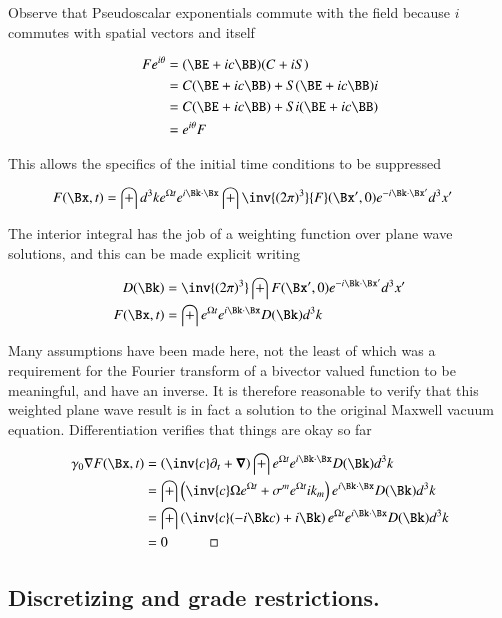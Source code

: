 Observe that Pseudoscalar exponentials commute with the field because $i$ commutes with spatial vectors and itself

\begin{align*}
F e^{i\theta}
&= (\BE + i c \BB) (C + iS) \\
&=
C (\BE + i c \BB)
+ S (\BE + i c \BB) i  \\
&=
C (\BE + i c \BB)
+ S i (\BE + i c \BB) \\
&=
e^{i\theta} F
\end{align*}

This allows the specifics of the initial time conditions to be suppressed

\begin{align}
F(\Bx,t) &= \int d^3 k e^{\Omega t} e^{i \Bk \cdot \Bx} \int \inv{(2\pi)^3} {F}(\Bx',0) e^{-i \Bk \cdot \Bx'}  d^3 x'
\end{align}

The interior integral has the job of a weighting function over plane wave solutions, and this can be made explicit writing

\begin{align}
D(\Bk) &= \inv{(2\pi)^3} \int {F}(\Bx',0) e^{-i \Bk \cdot \Bx'}  d^3 x' \\
F(\Bx,t) &= \int e^{\Omega t} e^{i \Bk \cdot \Bx} D(\Bk) d^3 k
\end{align}

Many assumptions have been made here, not the least of which was a requirement for the Fourier transform of a bivector valued function to be meaningful, and have an inverse.  It is therefore reasonable to verify that this weighted plane wave result is in fact a solution to the original Maxwell vacuum equation.  Differentiation verifies that things are okay so far

\begin{align*}
\gamma_0 \grad F(\Bx,t)
&=
\left(\inv{c}\partial_t + \spacegrad \right)\int e^{\Omega t} e^{i \Bk \cdot \Bx} D(\Bk) d^3 k \\
&=
\int \left(\inv{c}\Omega e^{\Omega t} + \sigma^m e^{\Omega t} i k_m \right) e^{i \Bk \cdot \Bx} D(\Bk) d^3 k \\
&=
\int \left(\inv{c}(-i \Bk c) + i \Bk \right) e^{\Omega t} e^{i \Bk \cdot \Bx} D(\Bk) d^3 k \\
&= 0 \quad\quad\quad\square
\end{align*}

\subsection{Discretizing and grade restrictions.}

